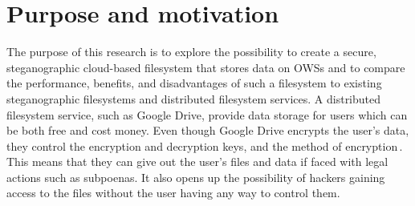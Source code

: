 
\section{Purpose and motivation}

The purpose of this research is to explore the possibility to create a secure, steganographic cloud-based filesystem that stores data on \gls{OWS}s and to compare the performance, benefits, and disadvantages of such a filesystem to existing steganographic filesystems and distributed filesystem services. A distributed filesystem service, such as Google Drive, provide data storage for users which can be both free and cost money. Even though Google Drive encrypts the user's data, they control the encryption and decryption keys, and the method of encryption\,\cite{johnsonGoogleDriveSecure2021}. This means that they can give out the user's files and data if faced with legal actions such as subpoenas. It also opens up the possibility of hackers gaining access to the files without the user having any way to control them.



